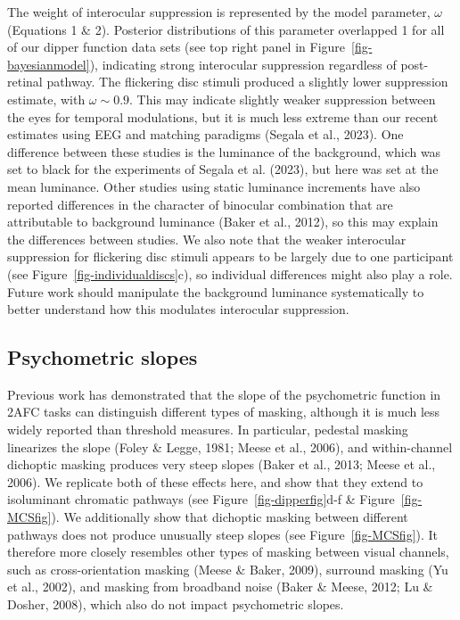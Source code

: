 \documentclass[
  letterpaper,
  DIV=11,
  numbers=noendperiod]{scrartcl}
\begin{document}
The weight of interocular suppression is represented by the model
parameter, \(\omega\) (Equations 1 \& 2). Posterior distributions of
this parameter overlapped 1 for all of our dipper function data sets
(see top right panel in Figure~\ref{fig-bayesianmodel}), indicating
strong interocular suppression regardless of post-retinal pathway. The
flickering disc stimuli produced a slightly lower suppression estimate,
with \(\omega \sim 0.9\). This may indicate slightly weaker suppression
between the eyes for temporal modulations, but it is much less extreme
than our recent estimates using EEG and matching paradigms (Segala et
al., 2023). One difference between these studies is the luminance of the
background, which was set to black for the experiments of Segala et al.
(2023), but here was set at the mean luminance. Other studies using
static luminance increments have also reported differences in the
character of binocular combination that are attributable to background
luminance (Baker et al., 2012), so this may explain the differences
between studies. We also note that the weaker interocular suppression
for flickering disc stimuli appears to be largely due to one participant
(see Figure~\ref{fig-individualdiscs}c), so individual differences might
also play a role. Future work should manipulate the background luminance
systematically to better understand how this modulates interocular
suppression.

\hypertarget{psychometric-slopes}{%
\subsection{Psychometric slopes}\label{psychometric-slopes}}

Previous work has demonstrated that the slope of the psychometric
function in 2AFC tasks can distinguish different types of masking,
although it is much less widely reported than threshold measures. In
particular, pedestal masking linearizes the slope (Foley \& Legge, 1981;
Meese et al., 2006), and within-channel dichoptic masking produces very
steep slopes (Baker et al., 2013; Meese et al., 2006). We replicate both
of these effects here, and show that they extend to isoluminant
chromatic pathways (see Figure~\ref{fig-dipperfig}d-f \&
Figure~\ref{fig-MCSfig}). We additionally show that dichoptic masking
between different pathways does not produce unusually steep slopes (see
Figure~\ref{fig-MCSfig}). It therefore more closely resembles other
types of masking between visual channels, such as cross-orientation
masking (Meese \& Baker, 2009), surround masking (Yu et al., 2002), and
masking from broadband noise (Baker \& Meese, 2012; Lu \& Dosher, 2008),
which also do not impact psychometric slopes.
\end{document}

